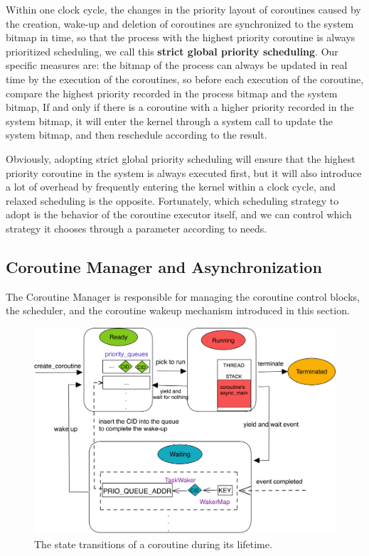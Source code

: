 \documentclass[conference]{IEEEtran}
\begin{document}
Within one clock cycle, the changes in the priority layout of coroutines caused by the creation, wake-up and deletion of coroutines are synchronized to the system bitmap in time, so that the process with the highest priority coroutine is always prioritized scheduling, we call this \textbf{strict global priority scheduling}.  Our specific measures are: the bitmap of the process can always be updated in real time by the execution of the coroutines, so before each execution of the coroutine, compare the highest priority recorded in the process bitmap and the system bitmap, If and only if there is a coroutine with a higher priority recorded in the system bitmap, it will enter the kernel through a system call to update the system bitmap, and then reschedule according to the result.

Obviously, adopting strict global priority scheduling will ensure that the highest priority coroutine in the system is always executed first, but it will also introduce a lot of overhead by frequently entering the kernel within a clock cycle, and relaxed scheduling is the opposite. Fortunately, which scheduling strategy to adopt is the behavior of the coroutine executor itself, and we can control which strategy it chooses through a parameter according to needs.


\subsection{Coroutine Manager and Asynchronization}

The Coroutine Manager is responsible for managing the coroutine control blocks, the scheduler, and the coroutine wakeup mechanism introduced in this section.

\begin{figure}[htbp]
\centerline{\includegraphics[width=\columnwidth]{states.png}}
\caption{The state transitions of a coroutine during its lifetime.}
\label{states}
\end{figure}
\end{document}
